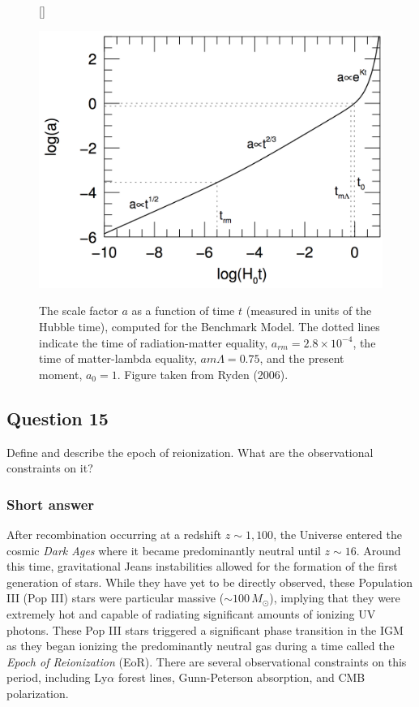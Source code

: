 \documentclass[a4paper,11pt]{article}
\begin{document}
\begin{figure}[t]
    [\FBwidth]
    {\caption{\footnotesize{The scale factor $a$ as a function of time $t$ (measured in units of the Hubble time), computed for the Benchmark Model. The dotted lines indicate the time of radiation-matter equality, $a_{rm}=2.8\times10^{-4}$, the time of matter-lambda equality, $a{m\Lambda}=0.75$, and the present moment, $a_0=1$. Figure taken from Ryden (2006).}}
    \label{fig:avst}}
    {\includegraphics[width=12cm]{figures/avst.png}}
\end{figure}

%
%

\newpage
\subsection{Question 15}

Define and describe the epoch of reionization. What are the observational constraints on it?

\subsubsection{Short answer}

After recombination occurring at a redshift $z\sim1,100$, the Universe entered the cosmic \textit{Dark Ages} where it became predominantly neutral until $z\sim16$. Around this time, gravitational Jeans instabilities allowed for the formation of the first generation of stars. While they have yet to be directly observed, these Population III (Pop III) stars were particular massive ($\sim100\,M_\odot$), implying that they were extremely hot and capable of radiating significant amounts of ionizing UV photons. These Pop III stars triggered a significant phase transition in the IGM as they began ionizing the predominantly neutral gas during a time called the \textit{Epoch of Reionization} (EoR). There are several observational constraints on this period, including Ly$\alpha$ forest lines, Gunn-Peterson absorption, and CMB polarization.
\end{document}
